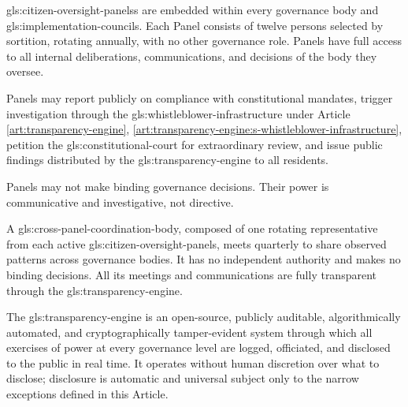 


\gls{gls:citizen-oversight-panels}s are embedded within every governance body and \gls{gls:implementation-councils}. Each Panel consists of twelve persons selected by sortition, rotating annually, with no other governance role. Panels have full access to all internal deliberations, communications, and decisions of the body they oversee.

Panels may report publicly on compliance with constitutional mandates, trigger investigation through the \gls{gls:whistleblower-infrastructure} under Article \ref{art:transparency-engine}, \ref{art:transparency-engine:s-whistleblower-infrastructure}, petition the \gls{gls:constitutional-court} for extraordinary review, and issue public findings distributed by the \gls{gls:transparency-engine} to all residents.

Panels may not make binding governance decisions. Their power is communicative and investigative, not directive.

A \gls{gls:cross-panel-coordination-body}, composed of one rotating representative from each active \gls{gls:citizen-oversight-panels}, meets quarterly to share observed patterns across governance bodies. It has no independent authority and makes no binding decisions. All its meetings and communications are fully transparent through the \gls{gls:transparency-engine}.


The \gls{gls:transparency-engine} is an open-source, publicly auditable, algorithmically automated, and cryptographically tamper-evident system through which all exercises of power at every governance level are logged, officiated, and disclosed to the public in real time. It operates without human discretion over what to disclose; disclosure is automatic and universal subject only to the narrow exceptions defined in this Article.

